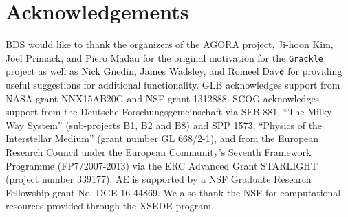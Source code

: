 \section*{Acknowledgements}

BDS would like to thank the organizers of the AGORA project, Ji-hoon
Kim, Joel Primack, and Piero Madau for the original motivation for the
\texttt{Grackle} project as well as Nick Gnedin, James Wadsley, and
Romeel Dav$\acute{\rm e}$ for providing useful suggestions for
additional functionality.  GLB acknowledges support from
NASA grant NNX15AB20G and NSF grant 1312888. SCOG acknowledges support
from the Deutsche Forschungsgemeinschaft via SFB 881, ``The Milky Way System'' 
(sub-projects B1, B2 and B8) and SPP 1573, ``Physics of the Interstellar Medium'' 
(grant number GL 668/2-1), and from the European Research Council under the 
European Community's Seventh Framework Programme (FP7/2007-2013) via the ERC 
Advanced Grant STARLIGHT (project number 339177). AE is supported by a NSF Graduate
Research Fellowship grant No. DGE-16-44869. We also thank the NSF for computational
resources provided through the XSEDE program.
